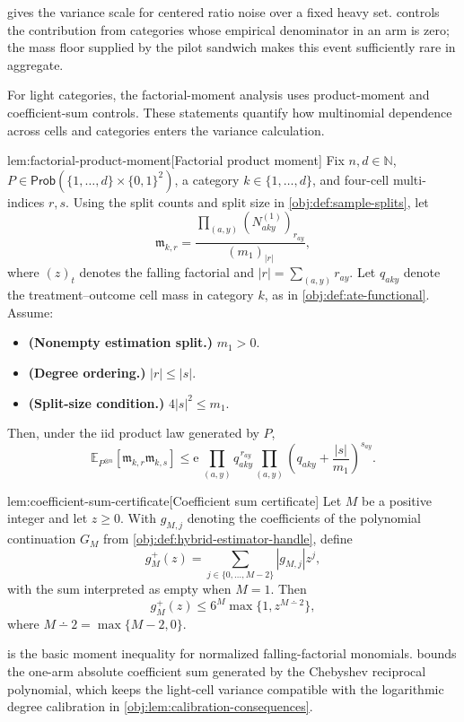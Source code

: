  gives the variance scale for centered ratio noise over a fixed heavy set.  controls the contribution from categories whose empirical denominator in an arm is zero; the mass floor supplied by the pilot sandwich makes this event sufficiently rare in aggregate.

For light categories, the factorial-moment analysis uses product-moment and coefficient-sum controls. These statements quantify how multinomial dependence across cells and categories enters the variance calculation.

\begin{lemmav}{lem:factorial-product-moment}[Factorial product moment]
Fix \(n,d\in\mathbb N\), \(P\in\mathsf{Prob}(\{1,\ldots,d\}\times\{0,1\}^2)\), a category \(k\in\{1,\ldots,d\}\), and four-cell multi-indices \(r,s\). Using the split counts and split size in \cref{obj:def:sample-splits}, let
\[
\mathfrak m_{k,r}
=
\frac{\prod_{(a,y)}(N^{(1)}_{aky})_{r_{ay}}}{(m_1)_{|r|}},
\]
where \((z)_t\) denotes the falling factorial and \(|r|=\sum_{(a,y)}r_{ay}\). Let \(q_{aky}\) denote the treatment--outcome cell mass in category \(k\), as in \cref{obj:def:ate-functional}. Assume:
\begin{itemize}
\item \textbf{(Nonempty estimation split.)} \(m_1>0\).
\item \textbf{(Degree ordering.)} \(|r|\le |s|\).
\item \textbf{(Split-size condition.)} \(4|s|^2\le m_1\).
\end{itemize}
Then, under the iid product law generated by \(P\),
\[
\mathbb E_{P^{\otimes n}}\!\left[\mathfrak m_{k,r}\mathfrak m_{k,s}\right]
\le \mathrm e\,\prod_{(a,y)}q_{aky}^{\,r_{ay}}
\prod_{(a,y)}
\left(q_{aky}+\frac{|s|}{m_1}\right)^{s_{ay}} .
\]
\end{lemmav}

\begin{lemmav}{lem:coefficient-sum-certificate}[Coefficient sum certificate]
Let \(M\) be a positive integer and let \(z\ge 0\). With \(g_{M,j}\) denoting the coefficients of the polynomial continuation \(G_M\) from \cref{obj:def:hybrid-estimator-handle}, define
\[
g_M^+(z)
=
\sum_{j\in\{0,\ldots,M-2\}} |g_{M,j}| z^j,
\]
with the sum interpreted as empty when \(M=1\). Then
\[
g_M^+(z)
\le
6^M \max\{1,z^{M\dotminus 2}\},
\]
where \(M\dotminus 2=\max\{M-2,0\}\).
\end{lemmav}

 is the basic moment inequality for normalized falling-factorial monomials.  bounds the one-arm absolute coefficient sum generated by the Chebyshev reciprocal polynomial, which keeps the light-cell variance compatible with the logarithmic degree calibration in \cref{obj:lem:calibration-consequences}.


